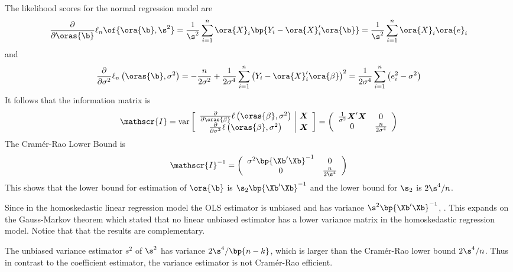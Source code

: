 The likelihood scores for the normal regression model are 
\begin{equation}
    \notag 
    \frac{\partial}{\partial \oras{\b}} \ell_n\of{\ora{\b}, \s^2} = \frac{1}{\s^2} \sum_{i=1}^{n} \ora{X}_i \bp{Y_i - \ora{X}_i^{\prime} \ora{\b}} = \frac{1}{\s^2} \sum_{i=1}^{n} \ora{X}_i \ora{e}_i 
\end{equation}
and 
\begin{equation}
    \notag 
    \frac{\partial}{\partial \sigma^2} \ell_n\left(\oras{\b}, \sigma^2\right)=-\frac{n}{2 \sigma^2}+\frac{1}{2 \sigma^4} \sum_{i=1}^n\left(Y_i-\ora{X}_i^{\prime} \ora{\beta}\right)^2=\frac{1}{2 \sigma^4} \sum_{i=1}^n\left(e_i^2-\sigma^2\right)
\end{equation}
It follows that the information matrix is 
\begin{equation}
    \notag 
    \mathscr{I}=\operatorname{var}\left[\begin{array}{c|c}
        \frac{\partial}{\partial \oras{\beta}} \ell\left(\oras{\beta}, \sigma^2\right) & \boldsymbol{X} \\
        \frac{\partial}{\partial \sigma^2} \ell\left(\oras{\beta}, \sigma^2\right) & \boldsymbol{X}
        \end{array}\right]=\left(\begin{array}{cc}
        \frac{1}{\sigma^2} \boldsymbol{X}^{\prime} \boldsymbol{X} & 0 \\
        0 & \frac{n}{2 \sigma^4}
        \end{array}\right)
\end{equation}
The Cramér-Rao Lower Bound is 
\begin{equation}
    \notag 
    \mathscr{I}^{-1} = \left(\begin{array}{cc}
        \sigma^2 \bp{\Xb^{\prime} \Xb}^{-1} & 0 \\
        0 & \frac{n}{2 \s^4}
        \end{array}\right)
\end{equation}
This shows that the lower bound for estimation of $\ora{\b}$ is $\s_2 \bp{\Xb^{\prime} \Xb}^{-1}$ and the lower bound for $\s_2$ is $2\s^4 / n$.

Since in the homoskedastic linear regression model the OLS estimator is unbiased and has variance $\s^2 \bp{\Xb^{\prime} \Xb}^{-1}$, .  This expands on the Gauss-Markov theorem which stated that no linear unbiased estimator has a lower variance matrix in the homoskedastic regression model. Notice that that the results are complementary. 

The unbiased variance estimator $s^2$ of $\s^2$ has variance $2 \s^4 / \bp{n-k}$, which is larger than the Cramér-Rao lower bound $2 \s^4 / n$. Thus in contrast to the coefficient estimator, the variance estimator is not Cramér-Rao efficient. 